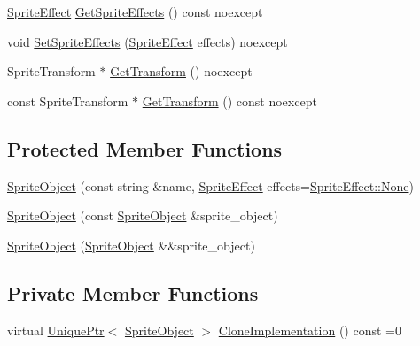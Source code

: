 \begin{DoxyCompactItemize}
\item 
\hyperlink{namespacemage_a9cfe18123066ba4236f548f9de75d881}{Sprite\+Effect} \hyperlink{classmage_1_1_sprite_object_a05f4124356abc1eec2158017ef3d947e}{Get\+Sprite\+Effects} () const noexcept
\item 
void \hyperlink{classmage_1_1_sprite_object_aef6cf252d79c9fcec978d83642da0e9a}{Set\+Sprite\+Effects} (\hyperlink{namespacemage_a9cfe18123066ba4236f548f9de75d881}{Sprite\+Effect} effects) noexcept
\item 
Sprite\+Transform $\ast$ \hyperlink{classmage_1_1_sprite_object_a709751381e87803088fc7013043bc65e}{Get\+Transform} () noexcept
\item 
const Sprite\+Transform $\ast$ \hyperlink{classmage_1_1_sprite_object_ada7bf149994abd24c652b83e8f9374ec}{Get\+Transform} () const noexcept
\end{DoxyCompactItemize}
\subsection*{Protected Member Functions}
\begin{DoxyCompactItemize}
\item 
\hyperlink{classmage_1_1_sprite_object_af68fccf1e8a51f5b4a99a48dfb515f65}{Sprite\+Object} (const string \&name, \hyperlink{namespacemage_a9cfe18123066ba4236f548f9de75d881}{Sprite\+Effect} effects=\hyperlink{namespacemage_a9cfe18123066ba4236f548f9de75d881a6adf97f83acf6453d4a6a4b1070f3754}{Sprite\+Effect\+::\+None})
\item 
\hyperlink{classmage_1_1_sprite_object_ac75871029cd740aeb0dd3e23d037b703}{Sprite\+Object} (const \hyperlink{classmage_1_1_sprite_object}{Sprite\+Object} \&sprite\+\_\+object)
\item 
\hyperlink{classmage_1_1_sprite_object_a32243a50679f743554850069f27cca9b}{Sprite\+Object} (\hyperlink{classmage_1_1_sprite_object}{Sprite\+Object} \&\&sprite\+\_\+object)
\end{DoxyCompactItemize}
\subsection*{Private Member Functions}
\begin{DoxyCompactItemize}
\item 
virtual \hyperlink{namespacemage_a8c307fbcc33bce9b7f2aa4c26c3b95cf}{Unique\+Ptr}$<$ \hyperlink{classmage_1_1_sprite_object}{Sprite\+Object} $>$ \hyperlink{classmage_1_1_sprite_object_acbbe3d5894e5a43df411b7e5785ae174}{Clone\+Implementation} () const =0
\end{DoxyCompactItemize}
